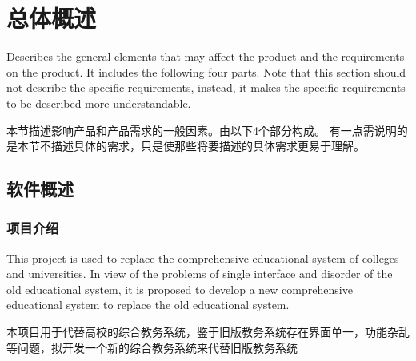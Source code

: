 \chapter{总体概述}

Describes the general elements that may affect the product and the requirements on the product. It includes the following four parts. Note that this section should not describe the specific requirements, instead, it makes the specific requirements to be described more understandable.

本节描述影响产品和产品需求的一般因素。由以下4个部分构成。 有一点需说明的是本节不描述具体的需求，只是使那些将要描述的具体需求更易于理解。
\section{软件概述}
\subsection{项目介绍}


This project is used to replace the comprehensive educational system of colleges and universities. In view of the problems of single interface and disorder of the old educational system, it is proposed to develop a new comprehensive educational system to replace the old educational system.

本项目用于代替高校的综合教务系统，鉴于旧版教务系统存在界面单一，功能杂乱等问题，拟开发一个新的综合教务系统来代替旧版教务系统



